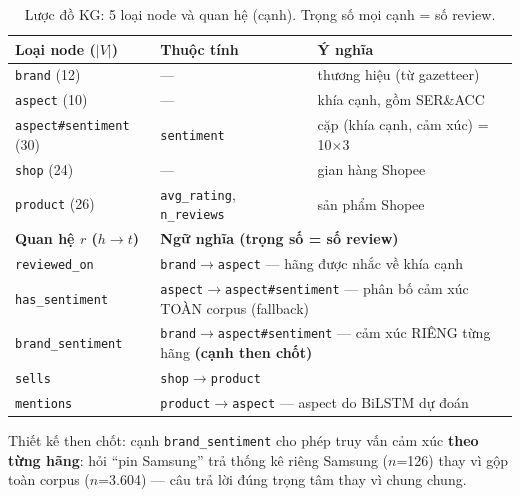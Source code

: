 \documentclass[12pt,a4paper]{article}
\begin{document}
\begin{table}[H]
\centering\small
\caption{Lược đồ KG: 5 loại node và quan hệ (cạnh). Trọng số mọi cạnh = số review.}
\begin{tabular}{p{2.7cm}p{2.3cm}p{7.2cm}}
\toprule
\textbf{Loại node} ($|V|$) & \textbf{Thuộc tính} & \textbf{Ý nghĩa} \\
\midrule
\texttt{brand} (12) & --- & thương hiệu (từ gazetteer) \\
\texttt{aspect} (10) & --- & khía cạnh, gồm SER\&ACC \\
\texttt{aspect\#sentiment} (30) & \texttt{sentiment} & cặp (khía cạnh, cảm xúc) = 10$\times$3 \\
\texttt{shop} (24) & --- & gian hàng Shopee \\
\texttt{product} (26) & \texttt{avg\_rating}, \texttt{n\_reviews} & sản phẩm Shopee \\
\midrule
\textbf{Quan hệ $r$ ($h\to t$)} & \multicolumn{2}{l}{\textbf{Ngữ nghĩa (trọng số = số review)}} \\
\midrule
\texttt{reviewed\_on} & \multicolumn{2}{l}{\texttt{brand}$\to$\texttt{aspect} --- hãng được nhắc về khía cạnh} \\
\texttt{has\_sentiment} & \multicolumn{2}{l}{\texttt{aspect}$\to$\texttt{aspect\#sentiment} --- phân bố cảm xúc TOÀN corpus (fallback)} \\
\texttt{brand\_sentiment} & \multicolumn{2}{l}{\texttt{brand}$\to$\texttt{aspect\#sentiment} --- cảm xúc RIÊNG từng hãng \textbf{(cạnh then chốt)}} \\
\texttt{sells} & \multicolumn{2}{l}{\texttt{shop}$\to$\texttt{product}} \\
\texttt{mentions} & \multicolumn{2}{l}{\texttt{product}$\to$\texttt{aspect} --- aspect do BiLSTM dự đoán} \\
\bottomrule
\end{tabular}
\end{table}

\noindent Thiết kế then chốt: cạnh \texttt{brand\_sentiment} cho phép truy vấn cảm xúc \textbf{theo từng hãng}: hỏi ``pin Samsung'' trả thống kê riêng Samsung ($n$=126) thay vì gộp toàn corpus ($n$=3.604) --- câu trả lời đúng trọng tâm thay vì chung chung.
\end{document}
